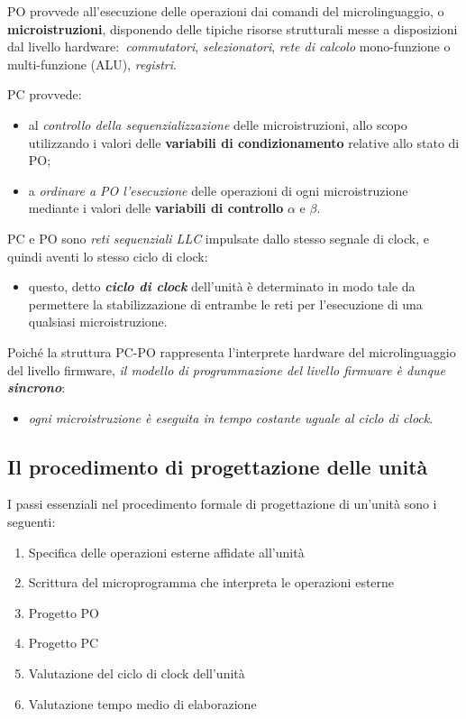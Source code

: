 PO provvede all'esecuzione delle operazioni dai comandi del microlinguaggio, o \textbf{microistruzioni}, disponendo delle tipiche risorse strutturali messe a disposizioni dal livello hardware:\ \textit{commutatori}, \textit{selezionatori}, \textit{rete di calcolo} mono-funzione o multi-funzione (ALU), \textit{registri}.

PC provvede:
\begin{itemize}
    \item al \textit{controllo della sequenzializzazione} delle microistruzioni, allo scopo utilizzando i valori delle \textbf{variabili di condizionamento} relative allo stato di PO;
    \item a \textit{ordinare a PO l'esecuzione} delle operazioni di ogni microistruzione mediante i valori delle \textbf{variabili di controllo} $\alpha$ e $\beta$.
\end{itemize}

\noindent PC e PO sono \textit{reti sequenziali LLC} impulsate dallo stesso segnale di clock, e quindi aventi lo stesso ciclo di clock:

\begin{itemize}
    \item questo, detto \textbf{\textit{ciclo di clock}} dell'unità è determinato in modo tale da permettere la stabilizzazione di entrambe le reti per l'esecuzione di una qualsiasi microistruzione.
\end{itemize}

\noindent Poiché la struttura PC-PO rappresenta l'interprete hardware del microlinguaggio del livello firmware, \textit{il modello di programmazione del livello firmware è dunque \textbf{sincrono}}:

\begin{itemize}
    \item \textit{ogni microistruzione è eseguita in tempo costante uguale al ciclo di clock}.
\end{itemize}

\subsection{Il procedimento di progettazione delle unità}

I passi essenziali nel procedimento formale di progettazione di un'unità sono i seguenti:

\begin{enumerate}
    \item Specifica delle operazioni esterne affidate all'unità
    \item Scrittura del microprogramma che interpreta le operazioni esterne
    \item Progetto PO
    \item Progetto PC
    \item Valutazione del ciclo di clock dell'unità
    \item Valutazione tempo medio di elaborazione
\end{enumerate}

